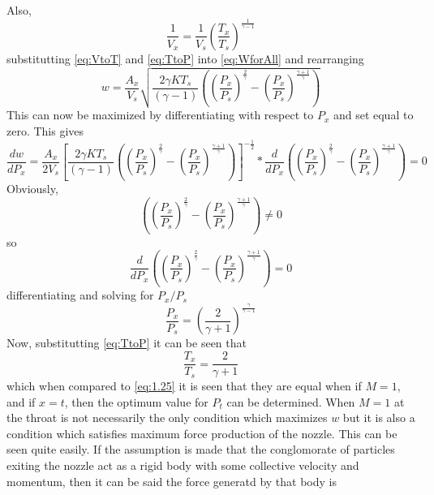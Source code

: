 Also,
\begin{equation}\label{eq:VtoT}
\frac{1}{V_x}=\frac{1}{V_s}\left(\frac{T_x}{T_s}\right)^{\frac{1}{\gamma-1}}
\end{equation}
substitutting \ref{eq:VtoT} and \ref{eq:TtoP} into \ref{eq:WforAll} and rearranging
\begin{equation}\label{eq:diffW}
w=\frac{A_x}{V_s}\sqrt{\frac{2\gamma KT_s}{(\gamma-1)}\left(\left(\frac{P_x}{P_s}\right)^{\frac{2}{\gamma}}-\left(\frac{P_x}{P_s}\right)^{\frac{\gamma+1}{\gamma}}\right)}
\end{equation}
This can now be maximized by differentiating with respect to $P_x$ and set equal to zero. This gives
\begin{equation}
\frac{dw}{dP_x}=\frac{A_x}{2V_s}\left[\frac{2\gamma KT_s}{(\gamma-1)}\left(\left(\frac{P_x}{P_s}\right)^{\frac{2}{\gamma}}-\left(\frac{P_x}{P_s}\right)^{\frac{\gamma+1}{\gamma}}\right)\right]^{-\frac{1}{2}}*\frac{d}{dP_x}\left(\left(\frac{P_x}{P_s}\right)^{\frac{2}{\gamma}}-\left(\frac{P_x}{P_s}\right)^{\frac{\gamma+1}{\gamma}}\right)=0
\end{equation}
Obviously, 
\begin{equation}
\left(\left(\frac{P_x}{P_s}\right)^{\frac{2}{\gamma}}-\left(\frac{P_x}{P_s}\right)^{\frac{\gamma+1}{\gamma}}\right)\neq0
\end{equation}
so
\begin{equation}
\frac{d}{dP_x}\left(\left(\frac{P_x}{P_s}\right)^{\frac{2}{\gamma}}-\left(\frac{P_x}{P_s}\right)^{\frac{\gamma+1}{\gamma}}\right)=0
\end{equation}
differentiating and solving for $P_x/P_s$
\begin{equation}
\frac{P_x}{P_s}=\left(\frac{2}{\gamma+1}\right)^{\frac{\gamma}{\gamma-1}}
\end{equation}
Now, substitutting \ref{eq:TtoP} it can be seen that
\begin{equation}
\frac{T_x}{T_s}=\frac{2}{\gamma+1}
\end{equation}
which when compared to \ref{eq:1.25} it is seen that they are equal when 
if $M=1$, and if $x=t$, then the optimum value for $P_t$ can be determined. When $M=1$ at the throat is not necessarily the only condition which maximizes $w$ but it is also a condition which satisfies maximum force production of the nozzle. This can be seen quite easily. If the assumption is made that the conglomorate of particles exiting the nozzle act as a rigid body with some collective velocity and momentum, then it can be said the force generatd by that body is
